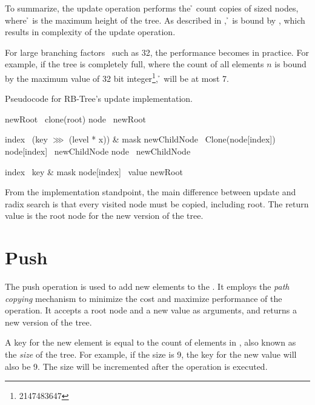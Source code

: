 To summarize, the update operation performs the \h{} count copies of \m{} sized nodes, where \h{} is the maximum height of the tree. As described in , \h{} is bound by , which results in {} complexity of the update operation.

For large branching factors \m\ such as 32, the performance becomes  in practice. For example, if the tree is completely full, where the count of all elements $n$ is bound by the maximum value of 32 bit integer\footnote{2147483647}, \h{} will be at most 7.

\begin{listing}[ht!]
    \caption{Pseudocode for RB-Tree's update implementation.}
    \label{lst:rb-tree-update}

    \begin{algorithmic}
            \State newRoot \la\ clone(root)
            \State node \la\ newRoot

                \State index \la\ (key $\ggg$ (level * x)) \& mask
                \State newChildNode \la\ Clone(node[index])
                \State node[index] \la\ newChildNode
                \State node \la\ newChildNode
            \EndFor

            \State index \la\ key \& mask
            \State node[index] \la\ value
            \State \Return newRoot
        \EndFunction
    \end{algorithmic}
\end{listing}

From the implementation standpoint, the main difference between update and radix search is that every visited node must be copied, including root. The return value is the root node for the new version of the tree.

\section{Push}
The push operation is used to add new elements to the \rbtree{}. It employs the \emph{path copying} mechanism to minimize the cost and maximize performance of the operation. It accepts a root node and a new value as arguments, and returns a new version of the tree.

A key for the new element is equal to the count of elements in \rbtree{}, also known as the \emph{size} of the tree. For example, if the size is 9, the key for the new value will also be 9. The size will be incremented after the operation is executed.

